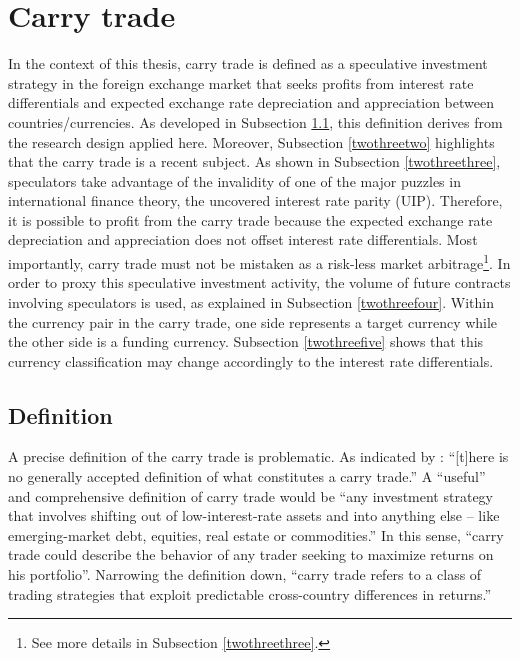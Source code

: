 \documentclass[a4paper, twoside]{templates/ociamthesis}
\begin{document}
\hypertarget{twothree}{%
\section{Carry trade}\label{twothree}}

\noindent In the context of this thesis, carry trade is defined as a speculative investment strategy in the foreign exchange market that seeks profits from interest rate differentials and expected exchange rate depreciation and appreciation between countries/currencies. As developed in Subsection \ref{twothreeone}, this definition derives from the research design applied here. Moreover, Subsection \ref{twothreetwo} highlights that the carry trade is a recent subject. As shown in Subsection \ref{twothreethree}, speculators take advantage of the invalidity of one of the major puzzles in international finance theory, the uncovered interest rate parity (UIP). Therefore, it is possible to profit from the carry trade because the expected exchange rate depreciation and appreciation does not offset interest rate differentials. Most importantly, carry trade must not be mistaken as a risk-less market arbitrage\footnote{See more details in Subsection \ref{twothreethree}.}. In order to proxy this speculative investment activity, the volume of future contracts involving speculators is used, as explained in Subsection \ref{twothreefour}. Within the currency pair in the carry trade, one side represents a target currency while the other side is a funding currency. Subsection \ref{twothreefive} shows that this currency classification may change accordingly to the interest rate differentials.

\hypertarget{twothreeone}{%
\subsection{Definition}\label{twothreeone}}

\noindent A precise definition of the carry trade is problematic. As indicated by \textcite[ 2]{gagnon2007}: ``{[}t{]}here is no generally accepted definition of what constitutes a carry trade.'' A ``useful'' and comprehensive definition of carry trade would be ``any investment strategy that involves shifting out of low-interest-rate assets and into anything else -- like emerging-market debt, equities, real estate or commodities.'' \autocite[ 41]{frankel2008} In this sense, ``carry trade could describe the behavior of any trader seeking to maximize returns on his portfolio''. \autocite[ 2]{gagnon2007} Narrowing the definition down, ``carry trade refers to a class of trading strategies that exploit predictable cross-country differences in returns.'' \autocite[ 4]{evans2017}
\end{document}
